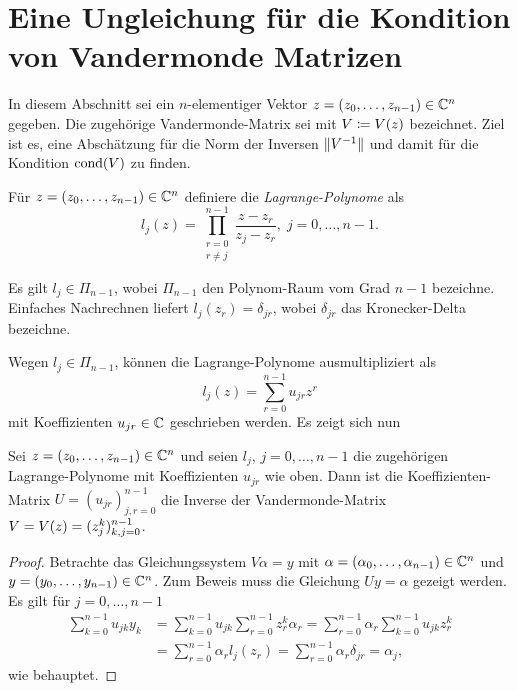 \chapter{Eine Ungleichung für die Kondition von Vandermonde Matrizen}
In diesem Abschnitt sei ein $n$-elementiger Vektor $z = (z_0, \dots, z_{n-1}) \in \mathbb{C}^n$ gegeben.
Die zugehörige Vandermonde-Matrix sei mit $V \coloneqq \text{$V(z)$}$ bezeichnet.
Ziel ist es, eine Abschätzung für die Norm der Inversen $\lVert V^{-1}\rVert$
und damit für die Kondition $\text{cond$(V)$}$
zu finden.

\begin{mydef}
    Für $ z = (z_0, \dots, z_{n-1}) \in \mathbb{C}^n $ definiere die
    \emph{Lagrange-Polynome} als
    \[
        l_j(z) = \prod_{\substack{r=0\\ r \neq j}}^{n-1} \frac{z - z_r}{z_j - z_r}, \; j = 0, \dots, n-1.
    \]
\end{mydef}

\begin{remark}
    Es gilt $l_j \in \Pi_{n-1}$, wobei $\Pi_{n-1}$ den Polynom-Raum vom Grad $n-1$ bezeichne.
    Einfaches Nachrechnen liefert $l_j(z_r) = \delta_{jr}$,
    wobei $\delta_{jr}$ das Kronecker-Delta bezeichne.
\end{remark}

Wegen $l_j \in \Pi_{n-1}$, können die Lagrange-Polynome ausmultipliziert als
\begin{equation}
    \label{eq:lagrange}
    l_j(z) = \sum_{r = 0}^{n-1} u_{jr} z^{r}
\end{equation}
mit Koeffizienten $u_{jr} \in \mathbb{C}$ geschrieben werden.
Es zeigt sich nun
\begin{lemma}
    Sei $z = (z_0, \dots, z_{n-1}) \in \mathbb{C}^n$ und seien
    $l_j$, $j = 0, \dots, n-1$ die zugehörigen Lagrange-Polynome
    mit Koeffizienten $u_{jr}$ wie oben.
    Dann ist die Koeffizienten-Matrix $U = (u_{jr})_{j,r = 0}^{n-1}$ die
    Inverse der Vandermonde-Matrix $V = \text{$V(z)$} = (z_{j}^{k})_{k,j = 0}^{n-1}$.
\end{lemma}

\begin{proof}
    Betrachte das Gleichungssystem $V \alpha = y$ mit $\alpha = (\alpha_0,
    \dots, \alpha_{n-1}) \in \mathbb{C}^n$ und $y = (y_0, \dots, y_{n-1}) \in \mathbb{C}^n$.
    Zum Beweis muss die Gleichung $U y = \alpha$ gezeigt werden.
    Es gilt für $j = 0, \dots, n-1$
    \[
        \begin{split}
            \sum_{k=0}^{n-1} u_{jk} y_k &= \sum_{k=0}^{n-1} u_{jk} \sum_{r=0}^{n-1} z_r^k \alpha_r = \sum_{r=0}^{n-1} \alpha_r \sum_{k=0}^{n-1} u_{jk} z_r^k\\
                                        &= \sum_{r=0}^{n-1} \alpha_r l_j(z_r) = \sum_{r=0}^{n-1} \alpha_r \delta_{jr} = \alpha_j,
        \end{split}
    \]
    wie behauptet.
\end{proof}

